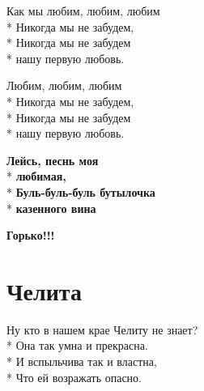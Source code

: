 \medskip

\begin{minipage}{\linewidth}
Как мы любим, любим, любим\\*
Никогда мы не забудем,\\*
Никогда мы не забудем\\*
нашу первую любовь.\\
\end{minipage}\par\medskip\nobreak

\medskip

\begin{minipage}{\linewidth}
Любим, любим, любим\\*
Никогда мы не забудем,\\*
Никогда мы не забудем\\*
нашу первую любовь.\\
\end{minipage}\par\medskip\nobreak

\medskip

\begin{minipage}{\linewidth}
\textbf{Лейсь, песнь моя}\\*
\textbf{любимая,}\\*
\textbf{Буль-буль-буль бутылочка}\\*
\textbf{казенного вина}\\
\end{minipage}\par\medskip\nobreak

\medskip

\begin{minipage}{\linewidth}
\textbf{Горько!!!}\\
\end{minipage}

\vspace{\fill}\newpage

\section{Челита}
\label{song:Челита}

\medskip

\begin{minipage}{\linewidth}
Ну кто в нашем крае Челиту не знает?\\*
Она так умна и прекрасна.\\*
И вспыльчива так и властна,\\*
Что ей возражать опасно.\\
\end{minipage}\par\medskip\nobreak

